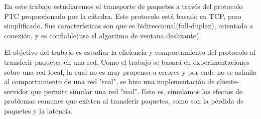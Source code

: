 En este trabajo estudiaremos el transporte de paquetes a través del protocolo PTC proporcionado por la cátedra. Este protocolo está basado en TCP, pero simplificado. Sus características son que es bidireccional(full-duplex), orientado a conexión, y es confiable(usa el algoritmo de ventana deslizante). 

El objetivo del trabajo es estudiar la eficiencia y comportamiento del protocolo al transferir paquetes en una red. Como el trabajo se basará en experimentaciones sobre una red local, la cual no es muy propensa a errores y por ende no se asimila al comportamiento de una red "real", se hizo una implementación de cliente-servidor que permite simular una red "real". Esto es, simulamos los efectos de problemas comunes que existen al transferir paquetes, como son la pérdida de paquetes y la latencia.